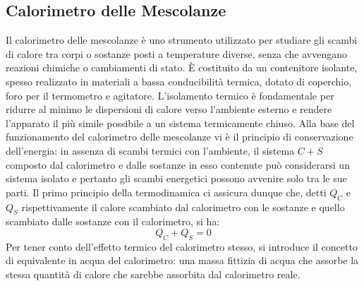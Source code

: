 \subsection{Calorimetro delle Mescolanze}
Il calorimetro delle mescolanze è uno strumento utilizzato per studiare gli scambi di calore tra corpi o sostanze posti a temperature diverse, senza che avvengano reazioni chimiche o cambiamenti di stato. È costituito da un contenitore isolante, spesso realizzato in materiali a bassa conducibilità termica, dotato di coperchio, foro per il termometro e agitatore. L'isolamento termico è fondamentale per ridurre al minimo le dispersioni di calore verso l'ambiente esterno e rendere l'apparato il più simile possibile a un sistema termicamente chiuso. Alla base del funzionamento del calorimetro delle mescolanze vi è il principio di conservazione dell'energia: in assenza di scambi termici con l'ambiente, il sistema $C+S$ composto dal calorimetro e dalle sostanze in esso contenute può considerarsi un sistema isolato e pertanto gli scambi energetici possono avvenire solo tra le sue parti. Il primo principio della termodinamica ci assicura dunque che, detti $Q_{C}$ e $Q_S$ rispettivamente il calore scambiato dal calorimetro con le sostanze e quello scambiato dalle sostanze con il calorimetro, si ha:
\begin{equation}
    Q_{C} + Q_{S} = 0
\end{equation}
Per tener conto dell'effetto termico del calorimetro stesso, si introduce il concetto di equivalente in acqua del calorimetro: una massa fittizia di acqua che assorbe la stessa quantità di calore che sarebbe assorbita dal calorimetro reale.

